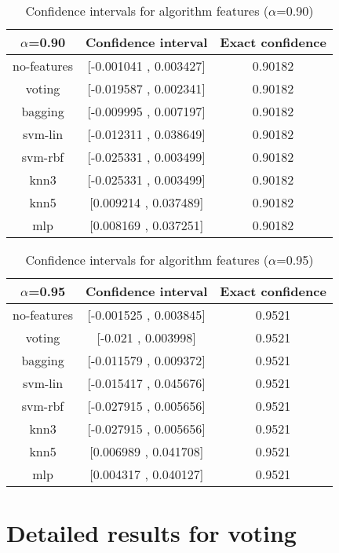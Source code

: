 \documentclass[a4paper,10pt]{article}
\begin{document}
\begin{table}[!htp]
\centering\small
\begin{tabular}{
|c|c|c|}
\hline
 $\alpha$=0.90 & Confidence interval & Exact confidence \\ \hline 
no-features & [-0.001041 , 0.003427] & 0.90182\\ \hline 
voting & [-0.019587 , 0.002341] & 0.90182\\ \hline 
bagging & [-0.009995 , 0.007197] & 0.90182\\ \hline 
svm-lin & [-0.012311 , 0.038649] & 0.90182\\ \hline 
svm-rbf & [-0.025331 , 0.003499] & 0.90182\\ \hline 
knn3 & [-0.025331 , 0.003499] & 0.90182\\ \hline 
knn5 & [0.009214 , 0.037489] & 0.90182\\ \hline 
mlp & [0.008169 , 0.037251] & 0.90182\\ \hline 

\end{tabular}
\caption{Confidence intervals for algorithm features ($\alpha$=0.90)}
\end{table}
\begin{table}[!htp]
\centering\small
\begin{tabular}{
|c|c|c|}
\hline
 $\alpha$=0.95 & Confidence interval & Exact confidence \\ \hline 
no-features & [-0.001525 , 0.003845] & 0.9521\\ \hline 
voting & [-0.021 , 0.003998] & 0.9521\\ \hline 
bagging & [-0.011579 , 0.009372] & 0.9521\\ \hline 
svm-lin & [-0.015417 , 0.045676] & 0.9521\\ \hline 
svm-rbf & [-0.027915 , 0.005656] & 0.9521\\ \hline 
knn3 & [-0.027915 , 0.005656] & 0.9521\\ \hline 
knn5 & [0.006989 , 0.041708] & 0.9521\\ \hline 
mlp & [0.004317 , 0.040127] & 0.9521\\ \hline 

\end{tabular}
\caption{Confidence intervals for algorithm features ($\alpha$=0.95)}
\end{table}

 \clearpage 


\section{Detailed results for voting}
\end{document}

